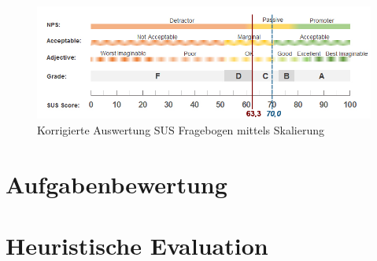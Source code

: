 \documentclass[12pt, aspectratio=169]{beamer}
\begin{document}
\begin{frame}
	
\end{frame}

\begin{frame}
	\begin{figure}
		\includegraphics[width=1\textwidth]{image/sus-scale-correct.png}
		\caption{Korrigierte Auswertung SUS Fragebogen mittels Skalierung}
	\end{figure}
\end{frame}

\section{Aufgabenbewertung}
\begin{frame}
	\hspace*{-20px}
	
\end{frame}

\begin{frame}
	\hspace*{-20px}
	
\end{frame}

\begin{frame}
	\hspace*{-20px}
	
\end{frame}

\section{Heuristische Evaluation}
\end{document}
